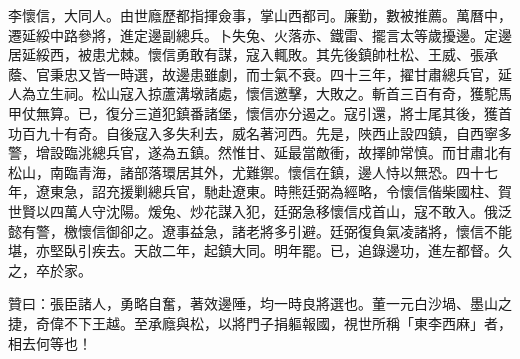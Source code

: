 \begin{pinyinscope}
李懷信，大同人。由世廕歷都指揮僉事，掌山西都司。廉勤，數被推薦。萬曆中，遷延綏中路參將，進定邊副總兵。卜失兔、火落赤、鐵雷、擺言太等歲擾邊。定邊居延綏西，被患尤棘。懷信勇敢有謀，寇入輒敗。其先後鎮帥杜松、王威、張承蔭、官秉忠又皆一時選，故邊患雖劇，而士氣不衰。四十三年，擢甘肅總兵官，延人為立生祠。松山寇入掠蘆溝墩諸處，懷信邀擊，大敗之。斬首三百有奇，獲駝馬甲仗無算。已，復分三道犯鎮番諸堡，懷信亦分遏之。寇引還，將士尾其後，獲首功百九十有奇。自後寇入多失利去，威名著河西。先是，陜西止設四鎮，自西寧多警，增設臨洮總兵官，遂為五鎮。然惟甘、延最當敵衝，故擇帥常慎。而甘肅北有松山，南臨青海，諸部落環居其外，尤難禦。懷信在鎮，邊人恃以無恐。四十七年，遼東急，詔充援剿總兵官，馳赴遼東。時熊廷弼為經略，令懷信偕柴國柱、賀世賢以四萬人守沈陽。煖兔、炒花謀入犯，廷弼急移懷信戍首山，寇不敢入。俄泛懿有警，檄懷信御卻之。遼事益急，諸老將多引避。廷弼復負氣凌諸將，懷信不能堪，亦堅臥引疾去。天啟二年，起鎮大同。明年罷。已，追錄邊功，進左都督。久之，卒於家。

贊曰：張臣諸人，勇略自奮，著效邊陲，均一時良將選也。董一元白沙堝、墨山之捷，奇偉不下王越。至承廕與松，以將門子捐軀報國，視世所稱「東李西麻」者，相去何等也！


\end{pinyinscope}
